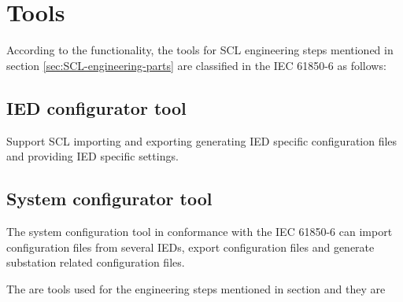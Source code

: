 \section{Tools}

According to the functionality, the tools for 
SCL engineering steps 
mentioned in section \ref{sec:SCL-engineering-parts} are
classified in the IEC 61850-6 \cite{IEC61850-6:2004} as
follows:

\subsection{IED configurator tool}
Support SCL importing and exporting generating IED specific 
configuration files and providing IED specific settings.

\subsection{System configurator tool}
The system configuration tool in conformance
with the IEC 61850-6 \cite{IEC61850-6:2004} can import 
configuration files from several \glspl{IED}, 
export configuration files and generate 
substation related configuration files.

The are tools used for the engineering steps 
mentioned in section  
and they are 

